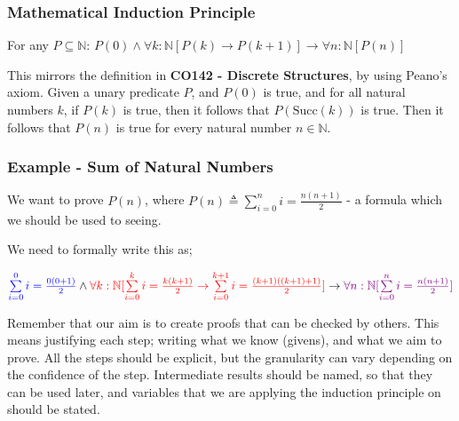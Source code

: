 \documentclass[a4paper, 12pt]{article}
\newcommand{\summation}[3]{\sum\limits_{#1}^{#2} #3}
\begin{document}
            \subsubsection*{Mathematical Induction Principle}
                For any $P \subseteq \mathbb{N}$: $P(0) \land \forall k : \mathbb{N}[P(k) \rightarrow P(k + 1)] \rightarrow \forall n : \mathbb{N}[P(n)]$
                \medskip

                This mirrors the definition in \textbf{CO142 - Discrete Structures}, by using Peano's axiom. Given a unary predicate $P$, and $P(0)$ is true, and for all natural numbers $k$, if $P(k)$ is true, then it follows that $P(\text{Succ}(k))$ is true. Then it follows that $P(n)$ is true for every natural number $n \in \mathbb{N}$.
            \subsubsection*{Example - Sum of Natural Numbers}
                We want to prove $P(n)$, where $P(n) \triangleq \summation{i = 0}{n}{i} = \frac{n(n + 1)}{2}$ - a formula which we should be used to seeing.
                \smallskip

                We need to formally write this as;
                \medskip

                $\textcolor{blue}{\summation{i = 0}{0}{i} = \frac{0(0 + 1)}{2}} \land \textcolor{red}{\forall k : \mathbb{N} [\summation{i = 0}{k}{i} = \frac{k(k + 1)}{2} \rightarrow \summation{i = 0}{k + 1}{i} = \frac{(k + 1)((k + 1) + 1)}{2}]} \rightarrow \textcolor{violet}{\forall n : \mathbb{N} [\summation{i = 0}{n}{i} = \frac{n(n + 1)}{2}]}$
                \bigskip

                Remember that our aim is to create proofs that can be checked by others. This means justifying each step; writing what we know (givens), and what we aim to prove. All the steps should be explicit, but the granularity can vary depending on the confidence of the step. Intermediate results should be named, so that they can be used later, and variables that we are applying the induction principle on should be stated.
\end{document}
